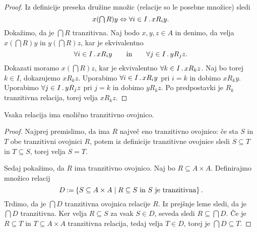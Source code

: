 \begin{proof}
  Iz definicije preseka družine množic (relacije so le posebne množice) sledi
  \begin{equation*}
  x (\textstyle\bigcap R) y \Leftrightarrow \forall i \in I \,.\, x R_i y.
  \end{equation*}
  Dokažimo, da je $\textstyle\bigcap R$ tranzitivna.
  Naj bodo $x, y, z \in A$ in denimo, da velja
  $x (\textstyle\bigcap R) y$ in $y (\textstyle\bigcap R) z$, kar je ekvivalentno
  \begin{equation*}
    \forall i \in I \,.\, x R_i y
    \qquad\text{in}\qquad
    \forall j \in I \,.\, y R_j z.
  \end{equation*}
  Dokazati moramo $x (\textstyle\bigcap R) z$, kar je ekvivalentno
  $\forall k \in I \,.\, x R_k z$.
  Naj bo torej $k \in I$, dokazujemo $x R_k z$. Uporabimo $\forall i \in I \,.\, x R_i y$ pri $i = k$ in dobimo $x R_k y$.
  Uporabimo $\forall j \in I \,.\, y R_j z$ pri $j = k$ in dobimo $y R_k z$.
  Po predpostavki je $R_k$ tranzitivna relacija, torej velja $x R_k z$.
\end{proof}

\begin{izrek}
  Vsaka relacija ima enolično tranzitivno ovojnico.
\end{izrek}

\begin{proof}
  Najprej premislimo, da ima $R$ največ eno tranzitivno ovojnico: če sta
  $S$ in $T$ obe tranzitivni ovojnici $R$, potem iz definicije tranzitivne ovojnice
  sledi $S \subseteq T$ in $T \subseteq S$, torej velja $S = T$.

  Sedaj pokažimo, da $R$ ima tranzitivno ovojnico. Naj bo $R \subseteq A \times A$. Definirajmo množico relacij
  \begin{equation*}
    D \mathbin{{:}{=}} \left\{ S \subseteq A \times A \; \middle| \; \text{$R \subseteq S$ in $S$ je tranzitivna} \right\}.
  \end{equation*}
  Trdimo, da je $\textstyle\bigcap D$ tranzitivna ovojnica relacije $R$.
  Iz prejšnje leme sledi, da je $\textstyle\bigcap D$ tranzitivna.
  Ker velja $R \subseteq S$ za vsak $S \in D$, seveda sledi $R \subseteq \textstyle\bigcap D$.
  Če je $R \subseteq T$ in $T \subseteq A \times A$ tranzitivna relacija, tedaj velja $T \in D$, torej je $\bigcap D \subseteq T$.
\end{proof}


